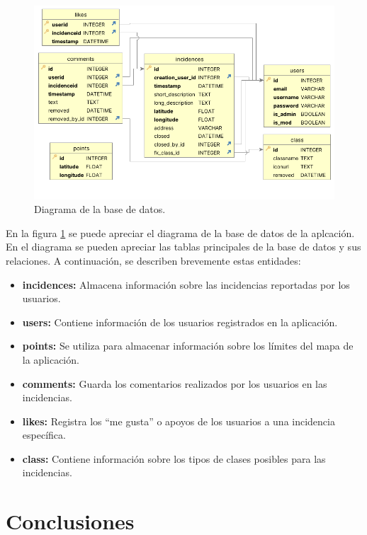 \documentclass{article}
\begin{document}
\begin{figure}[H]
    \centering
    \includegraphics[width=14cm]{images/db-diagrama.png}
    \caption{Diagrama de la base de datos.}
    \label{fig:diagrama_bd}
\end{figure}

En la figura \ref{fig:diagrama_bd} se puede apreciar el diagrama de la base de datos de la aplcación. En el diagrama se pueden apreciar las tablas principales de la base de datos y sus relaciones. A continuación, se describen brevemente estas entidades:

\begin{itemize}
    \item \textbf{incidences:} Almacena información sobre las incidencias reportadas por los usuarios.
    \item \textbf{users:} Contiene información de los usuarios registrados en la aplicación.
    \item \textbf{points:} Se utiliza para almacenar información sobre los límites del mapa de la aplicación.
    \item \textbf{comments:} Guarda los comentarios realizados por los usuarios en las incidencias.
    \item \textbf{likes:} Registra los ``me gusta'' o apoyos de los usuarios a una incidencia específica.
    \item \textbf{class:} Contiene información sobre los tipos de clases posibles para las incidencias.
\end{itemize}

\newpage

\section{Conclusiones}
\end{document}
